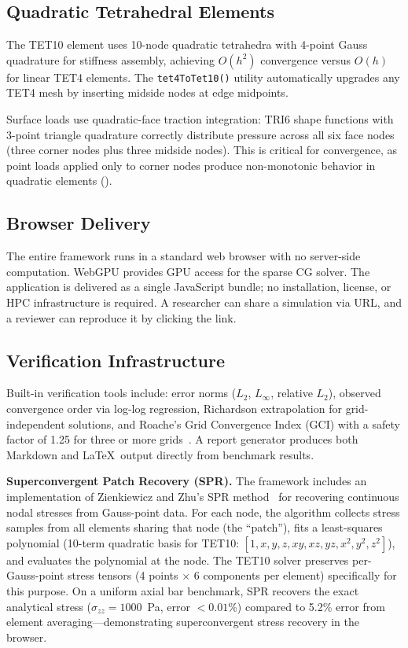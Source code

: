 \documentclass[journal]{IEEEtran}
\begin{document}
\subsection{Quadratic Tetrahedral Elements}

The TET10 element uses 10-node quadratic tetrahedra with 4-point Gauss
quadrature for stiffness assembly, achieving $O(h^2)$ convergence versus
$O(h)$ for linear TET4 elements. The \texttt{tet4ToTet10()} utility
automatically upgrades any TET4 mesh by inserting midside nodes at edge
midpoints.

Surface loads use quadratic-face traction integration: TRI6 shape functions
with 3-point triangle quadrature correctly distribute pressure across all
six face nodes (three corner nodes plus three midside nodes). This is
critical for convergence, as point loads applied only to corner nodes
produce non-monotonic behavior in quadratic elements
().

\subsection{Browser Delivery}

The entire framework runs in a standard web browser with no server-side
computation. WebGPU provides GPU access for the sparse CG solver. The
application is delivered as a single JavaScript bundle; no installation,
license, or HPC infrastructure is required. A researcher can share a
simulation via URL, and a reviewer can reproduce it by clicking the link.

\subsection{Verification Infrastructure}

Built-in verification tools include: error norms ($L_2$, $L_\infty$,
relative $L_2$), observed convergence order via log-log regression,
Richardson extrapolation for grid-independent solutions, and Roache's Grid
Convergence Index (GCI) with a safety factor of 1.25 for three or more
grids~\cite{Roache1994,Celik2008}. A report generator produces both
Markdown and \LaTeX\ output directly from benchmark results.

\textbf{Superconvergent Patch Recovery (SPR).}
The framework includes an implementation of Zienkiewicz and Zhu's
SPR method~\cite{ZZ1992} for recovering continuous nodal stresses from
Gauss-point data. For each node, the algorithm collects stress samples
from all elements sharing that node (the ``patch''), fits a least-squares
polynomial (10-term quadratic basis for TET10: $[1, x, y, z, xy, xz, yz,
x^2, y^2, z^2]$), and evaluates the polynomial at the node. The TET10
solver preserves per-Gauss-point stress tensors (4 points $\times$ 6
components per element) specifically for this purpose. On a uniform
axial bar benchmark, SPR recovers the exact analytical stress
($\sigma_{zz} = 1000$~Pa, error $< 0.01\%$) compared to 5.2\% error from
element averaging---demonstrating superconvergent stress recovery in the
browser.
\end{document}
